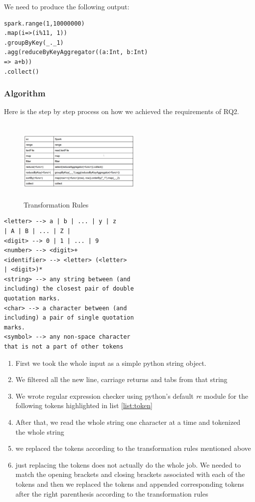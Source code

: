 \documentclass[sigplan]{acmart}\settopmatter{printfolios=true,printccs=false,printacmref=false}
\begin{document}
We need to produce the following output:
\begin{lstlisting}
spark.range(1,10000000)
.map(i=>(i%11, 1))
.groupByKey(_._1)
.agg(reduceByKeyAggregator((a:Int, b:Int) 
=> a+b))
.collect()
\end{lstlisting}

\subsubsection{Algorithm}
Here is the step by step process on how we achieved the requirements of RQ2.


\begin{figure}[h]
	\includegraphics[width=6cm,height=4cm,keepaspectratio]{fig/t1.png}
	\caption{Transformation Rules}
	\label{fig:token}
\end{figure}

\begin{lstlisting}[caption=token definition, label=list:token]
<letter> --> a | b | ... | y | z 
| A | B | ... | Z | 
<digit> --> 0 | 1 | ... | 9
<number> --> <digit>+
<identifier> --> <letter> (<letter> 
| <digit>)*
<string> --> any string between (and 
including) the closest pair of double 
quotation marks.
<char> --> a character between (and 
including) a pair of single quotation 
marks.
<symbol> --> any non-space character 
that is not a part of other tokens
\end{lstlisting}

\begin{enumerate}
    \item First we took the whole input as a simple python string object. 
    \item We filtered all the new line, carriage returns and tabs from that string
    \item We wrote regular expression checker using python's default \textit{re} module for the following tokens highlighted in list \ref{list:token}
    \item After that, we read the whole string one character at a time and tokenized the whole string
    \item we replaced the tokens according to the transformation rules mentioned above
    \item just replacing the tokens does not actually do the whole job. We needed to match the opening brackets and closing brackets associated with each of the tokens and then we replaced the tokens and appended corresponding tokens after the right parenthesis according to the transformation rules
\end{enumerate}
\end{document}
